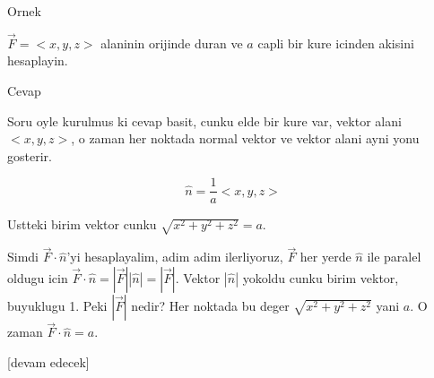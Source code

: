 \documentclass[12pt,fleqn]{article}\usepackage{../../common}
\begin{document}
Ornek

$\vec{F} = < x,y,z >$ alaninin orijinde duran ve $a$ capli bir kure icinden
akisini hesaplayin.

Cevap

Soru oyle kurulmus ki cevap basit, cunku elde bir kure var, vektor alani
$< x,y,z >$, o zaman her noktada normal vektor ve vektor alani ayni yonu gosterir.

$$
\hat{n} = \frac{1}{a} < x,y,z >
$$

Ustteki birim vektor cunku $\sqrt{x^2 + y^2 + z^2} = a$.

Simdi $\vec{F} \cdot \hat{n}$'yi hesaplayalim, adim adim ilerliyoruz,
$\vec{F}$ her yerde $\hat{n}$ ile paralel oldugu icin
$\vec{F} \cdot \hat{n} = |\vec{F}| |\hat{n}| = |\vec{F}|$. Vektor $|\hat{n}|$
yokoldu cunku birim vektor, buyuklugu 1. Peki $|\vec{F}|$ nedir? Her
noktada bu deger $\sqrt{x^2 + y^2 + z^2}$ yani $a$. O zaman
$\vec{F} \cdot \hat{n} = a$.






















[devam edecek]
\end{document}
